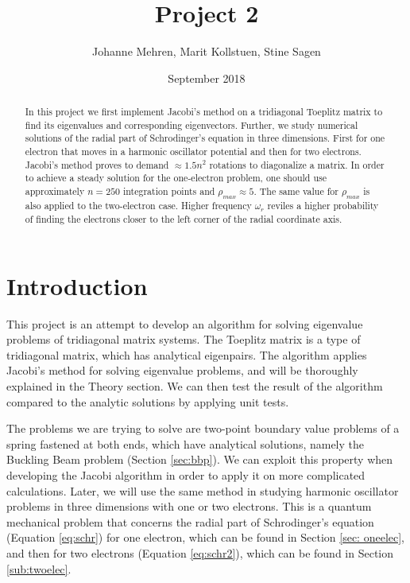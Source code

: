 \documentclass{article}
\title{Project 2}
\author{Johanne Mehren, Marit Kollstuen, Stine Sagen}
\date{September 2018}
\begin{document}
\maketitle

\begin{abstract}
In this project we first implement Jacobi's method on a tridiagonal Toeplitz matrix to find its eigenvalues and corresponding eigenvectors.  Further, we study numerical solutions of the radial part of Schrodinger's equation in three dimensions. First for one electron that moves in a harmonic oscillator potential and then for two electrons. Jacobi's method proves to demand $\approx 1.5n^2$ rotations to diagonalize a matrix. In order to achieve a steady solution for the one-electron problem, one should use approximately $n = 250$ integration points and $\rho_{max} \approx 5$. The same value for $\rho_{max}$ is also applied to the two-electron case. Higher frequency $\omega_r$ reviles a higher probability of finding the electrons closer to the left corner of the radial coordinate axis. 
\end{abstract}


\section{Introduction}

This project is an attempt to develop an algorithm for solving eigenvalue problems of tridiagonal matrix systems. The Toeplitz matrix is a type of tridiagonal matrix, which has analytical eigenpairs. The algorithm applies Jacobi's method for solving eigenvalue problems, and will be thoroughly explained in the Theory section. We can then test the result of the algorithm compared to the analytic solutions by applying unit tests.

\medskip

The problems we are trying to solve are two-point boundary value problems of a spring fastened at both ends, which have analytical solutions, namely the Buckling Beam problem (Section \ref{sec:bbp}). We can exploit this property when developing the Jacobi algorithm in order to apply it on more complicated calculations. Later, we will use the same method in studying harmonic oscillator problems in three dimensions with one or two electrons.  This is a quantum mechanical problem that concerns the radial part of Schrodinger's equation (Equation \ref{eq:schr}) for one electron, which can be found in Section \ref{sec: oneelec}, and then for two electrons (Equation \ref{eq:schr2}), which can be found in Section \ref{sub:twoelec}.
\end{document}

